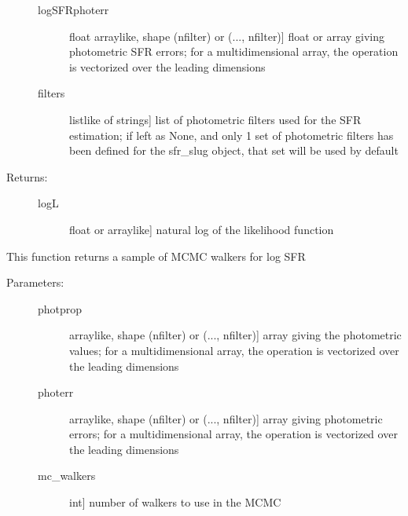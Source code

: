\documentclass[letterpaper,10pt,english]{sphinxmanual}
\begin{document}
\begin{fulllineitems}
\begin{fulllineitems}
\begin{description}
\begin{description}
\item[{logSFRphoterr}] \leavevmode{[}float arraylike, shape (nfilter) or (..., nfilter){]}
float or array giving photometric SFR errors; for a
multidimensional array, the operation is vectorized over
the leading dimensions

\item[{filters}] \leavevmode{[}listlike of strings{]}
list of photometric filters used for the SFR estimation;
if left as None, and only 1 set of photometric filters
has been defined for the sfr\_slug object, that set will
be used by default

\end{description}

\item[{Returns:}] \leavevmode\begin{description}
\item[{logL}] \leavevmode{[}float or arraylike{]}
natural log of the likelihood function

\end{description}

\end{description}

\end{fulllineitems}


\begin{fulllineitems}
\label{sfr_slug:slugpy.sfr_slug.sfr_slug.mcmc}
This function returns a sample of MCMC walkers for log SFR
\begin{description}
\item[{Parameters:}] \leavevmode\begin{description}
\item[{photprop}] \leavevmode{[}arraylike, shape (nfilter) or (..., nfilter){]}
array giving the photometric values; for a
multidimensional array, the operation is vectorized over
the leading dimensions

\item[{photerr}] \leavevmode{[}arraylike, shape (nfilter) or (..., nfilter){]}
array giving photometric errors; for a multidimensional
array, the operation is vectorized over the leading
dimensions

\item[{mc\_walkers}] \leavevmode{[}int{]}
number of walkers to use in the MCMC


\end{description}
\end{description}
\end{fulllineitems}
\end{fulllineitems}
\end{document}
